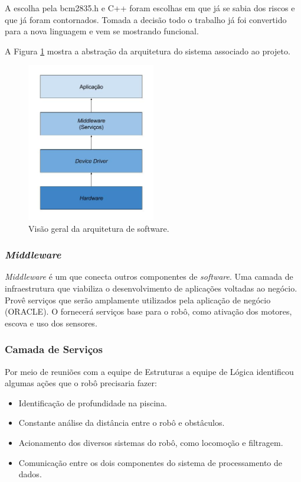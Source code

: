 A escolha pela \textsf{bcm2835.h} e C++ foram escolhas em que já se sabia dos riscos e que já foram contornados. Tomada a decisão todo o trabalho já foi convertido para a nova linguagem e vem se mostrando funcional.

A Figura \ref{fig:schema-arch} mostra a abstração da arquitetura do sistema associado ao projeto.
\par
\begin{figure}[h]
  \centering
  \includegraphics[width=0.5\textwidth]{figures/schema-arch.jpg}
  \caption{Visão geral da arquitetura de software.}
  \label{fig:schema-arch}
\end{figure}
\FloatBarrier
\par

\subsubsection{\textit{Middleware}}
\textit{Middleware} é um \software que conecta outros componentes de \textit{software}. Uma camada de infraestrutura que viabiliza o desenvolvimento de aplicações voltadas ao negócio. Provê serviços que serão amplamente utilizados pela aplicação de negócio (ORACLE). O \middleware fornecerá serviços base para o robô, como ativação dos motores, escova e uso dos sensores.

\subsubsection{Camada de Serviços}
Por meio de reuniões com a equipe de Estruturas a equipe de Lógica identificou algumas ações que o robô precisaria fazer:
\begin{itemize}
\item Identificação de profundidade na piscina.
\item Constante análise da distância entre o robô e obstâculos.
\item Acionamento dos diversos sistemas do robô, como locomoção e filtragem.
\item Comunicação entre os dois componentes do sistema de processamento de dados.
\end{itemize}

